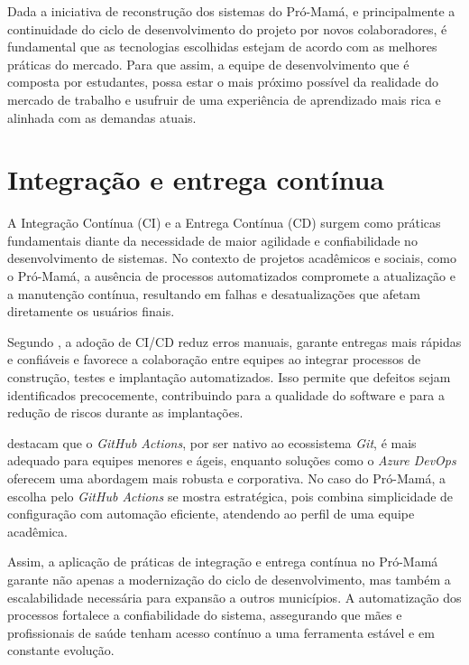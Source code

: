 Dada a iniciativa de reconstrução dos sistemas do Pró-Mamá, e principalmente a continuidade do ciclo de desenvolvimento do projeto por novos colaboradores, é fundamental que as tecnologias escolhidas estejam de acordo com as melhores práticas do mercado. Para que assim, a equipe de desenvolvimento que é composta por estudantes, possa estar o mais próximo possível da realidade do mercado de trabalho e usufruir de uma experiência de aprendizado mais rica e alinhada com as demandas atuais.

\section{Integração e entrega contínua}

A Integração Contínua (CI) e a Entrega Contínua (CD) surgem como práticas fundamentais diante da necessidade de maior agilidade e confiabilidade no desenvolvimento de sistemas. No contexto de projetos acadêmicos e sociais, como o Pró-Mamá, a ausência de processos automatizados compromete a atualização e a manutenção contínua, resultando em falhas e desatualizações que afetam diretamente os usuários finais.

Segundo , a adoção de CI/CD reduz erros manuais, garante entregas mais rápidas e confiáveis e favorece a colaboração entre equipes ao integrar processos de construção, testes e implantação automatizados. Isso permite que defeitos sejam identificados precocemente, contribuindo para a qualidade do software e para a redução de riscos durante as implantações.

 destacam que o \emph{GitHub Actions}, por ser nativo ao ecossistema \emph{Git}, é mais adequado para equipes menores e ágeis, enquanto soluções como o \emph{Azure DevOps} oferecem uma abordagem mais robusta e corporativa. No caso do Pró-Mamá, a escolha pelo \emph{GitHub Actions} se mostra estratégica, pois combina simplicidade de configuração com automação eficiente, atendendo ao perfil de uma equipe acadêmica.

Assim, a aplicação de práticas de integração e entrega contínua no Pró-Mamá garante não apenas a modernização do ciclo de desenvolvimento, mas também a escalabilidade necessária para expansão a outros municípios. A automatização dos processos fortalece a confiabilidade do sistema, assegurando que mães e profissionais de saúde tenham acesso contínuo a uma ferramenta estável e em constante evolução.
